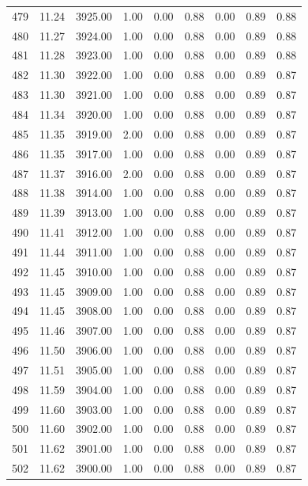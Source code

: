 \documentclass{article}\usepackage[]{graphicx}\usepackage[]{color}
\begin{document}
\begin{longtable}{rrrrrrrrr}
  479 & 11.24 & 3925.00 & 1.00 & 0.00 & 0.88 & 0.00 & 0.89 & 0.88 \\ 
  480 & 11.27 & 3924.00 & 1.00 & 0.00 & 0.88 & 0.00 & 0.89 & 0.88 \\ 
  481 & 11.28 & 3923.00 & 1.00 & 0.00 & 0.88 & 0.00 & 0.89 & 0.88 \\ 
  482 & 11.30 & 3922.00 & 1.00 & 0.00 & 0.88 & 0.00 & 0.89 & 0.87 \\ 
  483 & 11.30 & 3921.00 & 1.00 & 0.00 & 0.88 & 0.00 & 0.89 & 0.87 \\ 
  484 & 11.34 & 3920.00 & 1.00 & 0.00 & 0.88 & 0.00 & 0.89 & 0.87 \\ 
  485 & 11.35 & 3919.00 & 2.00 & 0.00 & 0.88 & 0.00 & 0.89 & 0.87 \\ 
  486 & 11.35 & 3917.00 & 1.00 & 0.00 & 0.88 & 0.00 & 0.89 & 0.87 \\ 
  487 & 11.37 & 3916.00 & 2.00 & 0.00 & 0.88 & 0.00 & 0.89 & 0.87 \\ 
  488 & 11.38 & 3914.00 & 1.00 & 0.00 & 0.88 & 0.00 & 0.89 & 0.87 \\ 
  489 & 11.39 & 3913.00 & 1.00 & 0.00 & 0.88 & 0.00 & 0.89 & 0.87 \\ 
  490 & 11.41 & 3912.00 & 1.00 & 0.00 & 0.88 & 0.00 & 0.89 & 0.87 \\ 
  491 & 11.44 & 3911.00 & 1.00 & 0.00 & 0.88 & 0.00 & 0.89 & 0.87 \\ 
  492 & 11.45 & 3910.00 & 1.00 & 0.00 & 0.88 & 0.00 & 0.89 & 0.87 \\ 
  493 & 11.45 & 3909.00 & 1.00 & 0.00 & 0.88 & 0.00 & 0.89 & 0.87 \\ 
  494 & 11.45 & 3908.00 & 1.00 & 0.00 & 0.88 & 0.00 & 0.89 & 0.87 \\ 
  495 & 11.46 & 3907.00 & 1.00 & 0.00 & 0.88 & 0.00 & 0.89 & 0.87 \\ 
  496 & 11.50 & 3906.00 & 1.00 & 0.00 & 0.88 & 0.00 & 0.89 & 0.87 \\ 
  497 & 11.51 & 3905.00 & 1.00 & 0.00 & 0.88 & 0.00 & 0.89 & 0.87 \\ 
  498 & 11.59 & 3904.00 & 1.00 & 0.00 & 0.88 & 0.00 & 0.89 & 0.87 \\ 
  499 & 11.60 & 3903.00 & 1.00 & 0.00 & 0.88 & 0.00 & 0.89 & 0.87 \\ 
  500 & 11.60 & 3902.00 & 1.00 & 0.00 & 0.88 & 0.00 & 0.89 & 0.87 \\ 
  501 & 11.62 & 3901.00 & 1.00 & 0.00 & 0.88 & 0.00 & 0.89 & 0.87 \\ 
  502 & 11.62 & 3900.00 & 1.00 & 0.00 & 0.88 & 0.00 & 0.89 & 0.87 \\ 

\end{longtable}
\end{document}
